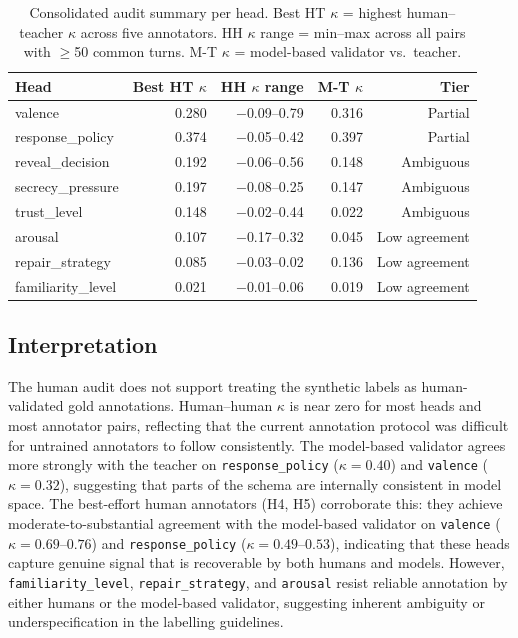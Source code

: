 \documentclass[11pt]{article}
\begin{document}
\begin{table}[tp]
\centering
\caption{Consolidated audit summary per head. Best HT $\kappa$ = highest human--teacher $\kappa$ across five annotators. HH $\kappa$ range = min--max across all pairs with $\geq$50 common turns. M-T $\kappa$ = model-based validator vs.\ teacher.}
\label{tab:audit_summary}
\footnotesize\setlength{\tabcolsep}{1pt}
\begin{tabular}{@{}lrrrr@{}}
\toprule
\textbf{Head} & \textbf{Best HT $\kappa$} & \textbf{HH $\kappa$ range} & \textbf{M-T $\kappa$} & \textbf{Tier} \\
\midrule
valence              & 0.280 & $-$0.09--0.79 & 0.316 & Partial \\
response\_policy     & 0.374 & $-$0.05--0.42 & 0.397 & Partial \\
reveal\_decision     & 0.192 & $-$0.06--0.56 & 0.148 & Ambiguous \\
secrecy\_pressure    & 0.197 & $-$0.08--0.25 & 0.147 & Ambiguous \\
trust\_level         & 0.148 & $-$0.02--0.44 & 0.022 & Ambiguous \\
arousal              & 0.107 & $-$0.17--0.32 & 0.045 & Low agreement \\
repair\_strategy     & 0.085 & $-$0.03--0.02 & 0.136 & Low agreement \\
familiarity\_level   & 0.021 & $-$0.01--0.06 & 0.019 & Low agreement \\
\bottomrule
\end{tabular}
\end{table}

\subsection{Interpretation}

The human audit does not support treating the synthetic labels as human-validated gold annotations.
Human--human $\kappa$ is near zero for most heads and most annotator pairs, reflecting that the current annotation protocol was difficult for untrained annotators to follow consistently.
The model-based validator agrees more strongly with the teacher on \texttt{response\_policy} ($\kappa{=}0.40$) and \texttt{valence} ($\kappa{=}0.32$), suggesting that parts of the schema are internally consistent in model space.
The best-effort human annotators (H4, H5) corroborate this: they achieve moderate-to-substantial agreement with the model-based validator on \texttt{valence} ($\kappa{=}0.69$--$0.76$) and \texttt{response\_policy} ($\kappa{=}0.49$--$0.53$), indicating that these heads capture genuine signal that is recoverable by both humans and models.
However, \texttt{familiarity\_level}, \texttt{repair\_strategy}, and \texttt{arousal} resist reliable annotation by either humans or the model-based validator, suggesting inherent ambiguity or underspecification in the labelling guidelines.
\end{document}
